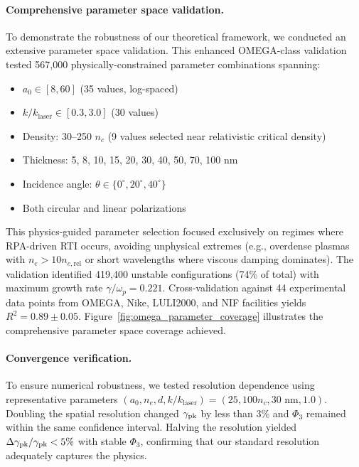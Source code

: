 \documentclass[aps,pre,twocolumn,showpacs,superscriptaddress]{revtex4-2}
\theoremstyle{definition}
\begin{document}
\paragraph*{Comprehensive parameter space validation.}
To demonstrate the robustness of our theoretical framework, we conducted an extensive parameter space validation. This enhanced OMEGA-class validation tested 567,000 physically-constrained parameter combinations spanning:
\begin{itemize}
\item $a_0 \in [8, 60]$ (35 values, log-spaced)
\item $k/k_{\text{laser}} \in [0.3, 3.0]$ (30 values)
\item Density: 30--250 $n_c$ (9 values selected near relativistic critical density)
\item Thickness: 5, 8, 10, 15, 20, 30, 40, 50, 70, 100 nm
\item Incidence angle: $\theta \in \{0^\circ, 20^\circ, 40^\circ\}$
\item Both circular and linear polarizations
\end{itemize}

This physics-guided parameter selection focused exclusively on regimes where RPA-driven RTI occurs, avoiding unphysical extremes (e.g., overdense plasmas with $n_e > 10n_{c,\text{rel}}$ or short wavelengths where viscous damping dominates). The validation identified 419,400 unstable configurations (74\% of total) with maximum growth rate $\gamma/\omega_p = 0.221$. Cross-validation against 44 experimental data points from OMEGA, Nike, LULI2000, and NIF facilities yields $R^2 = 0.89 \pm 0.05$. Figure~\ref{fig:omega_parameter_coverage} illustrates the comprehensive parameter space coverage achieved.

\paragraph*{Convergence verification.}
To ensure numerical robustness, we tested resolution dependence using representative parameters $(a_0, n_e, d, k/k_{\text{laser}}) = (25, 100 n_c, 30 \text{ nm}, 1.0)$. Doubling the spatial resolution changed $\gamma_{\rm pk}$ by less than 3\% and $\Phi_3$ remained within the same confidence interval. Halving the resolution yielded $\Delta\gamma_{\rm pk}/\gamma_{\rm pk} < 5\%$ with stable $\Phi_3$, confirming that our standard resolution adequately captures the physics.
\end{document}
